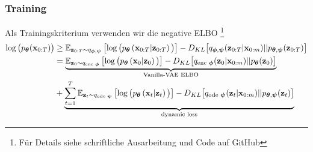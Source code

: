 \begin{frame}
    \frametitle{Training}
    Als Trainingskriterium verwenden wir die negative ELBO \footnote{Für Details siehe schriftliche Ausarbeitung und Code auf GitHub %
    }	
    	{\footnotesize\begin{align*}
    \log\big(p_{\boldsymbol{\theta}}(\mathbf{x}_{0:T})\big)&\ge \mathbb{E}_{\mathbf{z}_{0:T}\sim q_{\boldsymbol\phi,\boldsymbol\psi}}
    \left[\log\big(p_{\boldsymbol\theta}\left(\mathbf{x}_{0:T}|\mathbf{z}_{0:T}\right)\big)\right] - D_{KL}\big[q_{\boldsymbol\phi,\boldsymbol\psi}(\mathbf{z}_{0:T}|\mathbf{x}_{0:m})||p_{\boldsymbol\theta,\boldsymbol\psi}(\mathbf{z}_{0:T})\big]\\
    &=\underbrace{\mathbb{E}_{\mathbf{z}_{0}\sim q_{\text{enc }\boldsymbol\phi}}
    	\left[\log\big(p_{\boldsymbol\theta}\left(\mathbf{x}_{0}|\mathbf{z}_{0}\right)\big)\right] - D_{KL}\big[q_{\text{enc }\boldsymbol\phi}(\mathbf{z}_{0}|\mathbf{x}_{0:m})||p_{\boldsymbol\theta}(\mathbf{z}_{0})\big]}_{\text{Vanilla-VAE ELBO}}\\ &+ \underbrace{\sum_{t=1}^T \mathbb{E}_{\mathbf{z}_{t}\sim q_{\text{ode }\boldsymbol\psi}}
    	\left[\log\big(p_{\boldsymbol\theta}\left(\mathbf{x}_{t}|\mathbf{z}_{t}\right)\big)\right] - D_{KL}\big[q_{\text{ode }\boldsymbol\psi}(\mathbf{z}_{t}|\mathbf{x}_{0:m})||p_{\boldsymbol\theta,\boldsymbol\psi}(\mathbf{z}_{t})\big]}_{\text{dynamic loss}}
    \end{align*}}
\end{frame}



